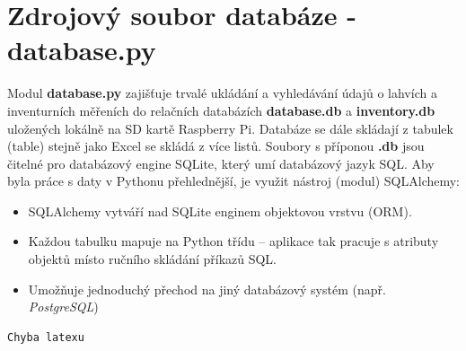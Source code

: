 \section{Zdrojový soubor databáze - database.py}

Modul \textbf{database.py} zajišťuje trvalé ukládání a vyhledávání údajů o lahvích a inventurních měřeních do relačních databázích \textbf{database.db} a \textbf{inventory.db} uložených lokálně na SD kartě Raspberry Pi. Databáze se dále skládají z tabulek (table) stejně jako Excel se skládá z více listů. Soubory s příponou \textbf{.db} jsou čitelné pro databázový engine SQLite, který umí databázový jazyk SQL. Aby byla práce s daty v Pythonu přehlednější, je využit nástroj (modul) SQLAlchemy:
\begin{itemize}
    \item SQLAlchemy vytváří nad SQLite enginem objektovou vrstvu (ORM).
    \item Každou tabulku mapuje na Python třídu – aplikace tak pracuje s atributy objektů místo ručního skládání příkazů SQL.
    \item Umožňuje jednoduchý přechod na jiný databázový systém (např. \textit{PostgreSQL})
\end{itemize}

\begin{lstlisting}[language=Python,breaklines=false, frame=single, caption=Ukázka třídy database.db a inventory.db]
Chyba latexu
\end{lstlisting}

